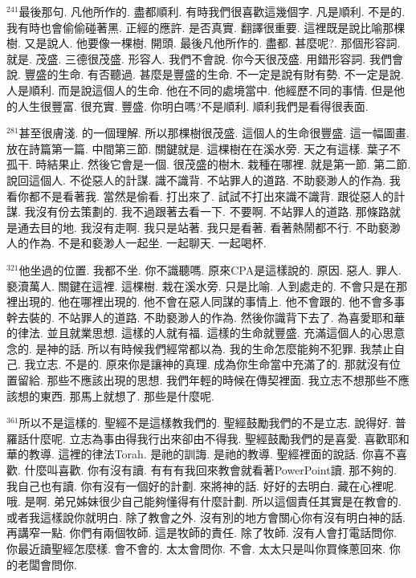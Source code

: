 \documentclass{book}
\begin{document}
$^{241}$最後那句.
凡他所作的.
盡都順利.
有時我們很喜歡這幾個字.
凡是順利.
不是的.
我有時也會偷偷碰著黑.
正經的應許.
是否真實.
翻譯很重要.
這裡既是說比喻那棵樹.
又是說人.
他要像一棵樹.
開頭.
最後凡他所作的.
盡都.
甚麼呢?.
那個形容詞.
就是.
茂盛.
三德很茂盛.
形容人.
我們不會說.
你今天很茂盛.
用錯形容詞.
我們會說.
豐盛的生命.
有否聽過.
甚麼是豐盛的生命.
不一定是說有財有勢.
不一定是說.
人是順利.
而是說這個人的生命.
他在不同的處境當中.
他經歷不同的事情.
但是他的人生很豐富.
很充實.
豐盛.
你明白嗎?不是順利.
順利我們是看得很表面.

$^{281}$甚至很膚淺.
的一個理解.
所以那棵樹很茂盛.
這個人的生命很豐盛.
這一幅圖畫.
放在詩篇第一篇.
中間第三節.
關鍵就是.
這棵樹在在溪水旁.
天之有這樣.
葉子不孤干.
時結果止.
然後它會是一個.
很茂盛的樹木.
栽種在哪裡.
就是第一節.
第二節.
說回這個人.
不從惡人的計謀.
識不識背.
不站罪人的道路.
不助褻渺人的作為.
我看你都不是看著我.
當然是偷看.
打出來了.
試試不打出來識不識背.
跟從惡人的計謀.
我沒有份去策劃的.
我不過跟著去看一下.
不要啊.
不站罪人的道路.
那條路就是通去目的地.
我沒有走啊.
我只是站著.
我只是看著.
看著熱鬧都不行.
不助褻渺人的作為.
不是和褻渺人一起坐.
一起聊天.
一起喝杯.

$^{321}$他坐過的位置.
我都不坐.
你不識聽嗎.
原來CPA是這樣說的.
原因.
惡人.
罪人.
褻瀆萬人.
關鍵在這裡.
這棵樹.
栽在溪水旁.
只是比喻.
人到處走的.
不會只是在那裡出現的.
他在哪裡出現的.
他不會在惡人同謀的事情上.
他不會跟的.
他不會多事幹去裝的.
不站罪人的道路.
不助褻渺人的作為.
然後你識背下去了.
為喜愛耶和華的律法.
並且就業思想.
這樣的人就有福.
這樣的生命就豐盛.
充滿這個人的心思意念的.
是神的話.
所以有時候我們經常都以為.
我的生命怎麼能夠不犯罪.
我禁止自己.
我立志.
不是的.
原來你是讓神的真理.
成為你生命當中充滿了的.
那就沒有位置留給.
那些不應該出現的思想.
我們年輕的時候在傳契裡面.
我立志不想那些不應該想的東西.
那馬上就想了.
那些是什麼呢.

$^{361}$所以不是這樣的.
聖經不是這樣教我們的.
聖經鼓勵我們的不是立志.
說得好.
普羅話什麼呢.
立志為事由得我行出來卻由不得我.
聖經鼓勵我們的是喜愛.
喜歡耶和華的教導.
這裡的律法Torah.
是祂的訓誨.
是祂的教導.
聖經裡面的說話.
你喜不喜歡.
什麼叫喜歡.
你有沒有讀.
有有有我回來教會就看著PowerPoint讀.
那不夠的.
我自己也有讀.
你有沒有一個好的計劃.
來將神的話.
好好的去明白.
藏在心裡呢.
哦.
是啊.
弟兄姊妹很少自己能夠懂得有什麼計劃.
所以這個責任其實是在教會的.
或者我這樣說你就明白.
除了教會之外.
沒有別的地方會關心你有沒有明白神的話.
再講窄一點.
你們有兩個牧師.
這是牧師的責任.
除了牧師.
沒有人會打電話問你.
你最近讀聖經怎麼樣.
會不會的.
太太會問你.
不會.
太太只是叫你買條蔥回來.
你的老闆會問你.
\end{document}
